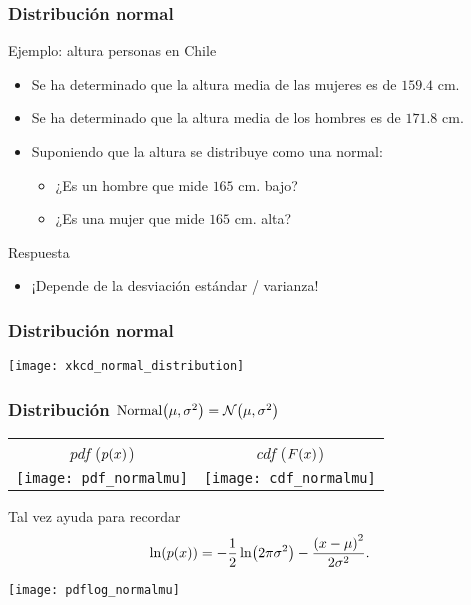 \documentclass[table]{beamer}
\begin{document}
\begin{frame}
    \frametitle{Distribución normal}
    \begin{exampleblock}{Ejemplo: altura personas en Chile}
        \begin{itemize}
            \item Se ha determinado que la altura media de las mujeres es de $159.4$ cm.
            \item Se ha determinado que la altura media de los hombres es de $171.8$ cm.
            \item Suponiendo que la altura se distribuye como una normal:
                \begin{itemize}
                    \item ¿Es un hombre que mide $165$ cm. bajo?
                    \item ¿Es una mujer que mide $165$ cm. alta?
                \end{itemize}
        \end{itemize}
    \end{exampleblock}
    \begin{block}{Respuesta}
        \begin{itemize}
            \item ¡Depende de la desviación estándar / varianza!
        \end{itemize}
    \end{block}
\end{frame}

\begin{frame}
    \frametitle{Distribución normal}
    \begin{center}
        \texttt{[image: xkcd\_normal\_distribution]}
    \end{center}
\end{frame}

\begin{frame}
    \frametitle{Distribución $\text{Normal} \parens{\mu, \sigma^{2}} = \normal{\mu}{\sigma^{2}}$}
    \begin{center}
        \begin{tabular}{cc}
            \emph{pdf} ($\pdf{x}$) & \emph{cdf} ($\FF{x}$) \\
            \texttt{[image: pdf\_normalmu]} &
            \texttt{[image: cdf\_normalmu]}
        \end{tabular}
    \end{center}
    \begin{block}{Tal vez ayuda para recordar}
        \begin{equation*}
            \ln \parens{\pdf{x}} = - \frac{1}{2} \ln \parens{2 \pi \sigma^{2}} - \frac{\parens{x - \mu}^{2}}{2 \sigma^{2}} .
        \end{equation*}
    \end{block}
    \begin{center}
        \texttt{[image: pdflog\_normalmu]}
    \end{center}
\end{frame}
\end{document}
